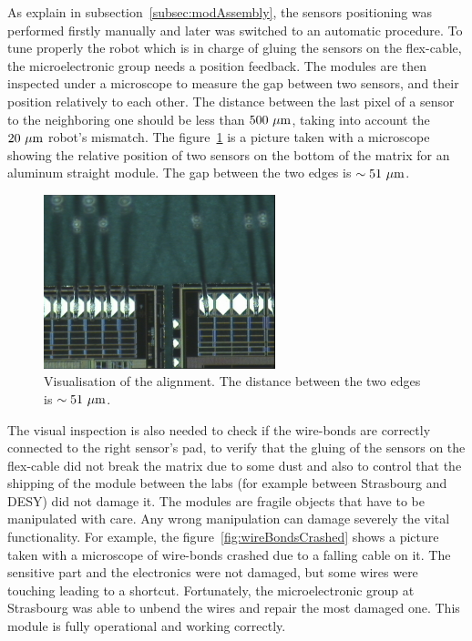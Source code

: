   As explain in subsection~\ref{subsec:modAssembly}, the sensors positioning was performed firstly manually and later was switched to an automatic procedure.
  To tune properly the robot which is in charge of gluing the sensors on the flex-cable, the microelectronic group needs a position feedback.
  The modules are then inspected under a microscope to measure the gap between two sensors, and their position relatively to each other.
  The distance between the last pixel of a sensor to the neighboring one should be less than $500~\mu\rm{m}$, taking into account the $20~\mu\rm{m}$ robot's mismatch.
  The figure~\ref{fig:visAlign} is a picture taken with a microscope showing the relative position of two sensors on the bottom of the matrix for an aluminum straight module.
  The gap between the two edges is $\sim 51~\mu\rm{m}$. 
  
  \begin{figure}
    \centering
    \includegraphics[width=0.6\textwidth]{Pictures/labTests/alignment_sensors.jpg}
    \caption{Visualisation of the alignment. The distance between the two edges is $\sim 51~\mu\rm{m}$.}
    \label{fig:visAlign}
  \end{figure}
  
  The visual inspection is also needed to check if the wire-bonds are correctly connected to the right sensor's pad, to verify that the gluing of the sensors on the flex-cable did not break the matrix due to some dust and also to control that the shipping of the module between the labs (for example between Strasbourg and DESY) did not damage it.
  The modules are fragile objects that have to be manipulated with care.
  Any wrong manipulation can damage severely the vital functionality.
  For example, the figure~\ref{fig:wireBondsCrashed} shows a picture taken with a microscope of wire-bonds crashed due to a falling cable on it.
  The sensitive part and the electronics were not damaged, but some wires were touching leading to a shortcut.
  Fortunately, the microelectronic group at Strasbourg was able to unbend the wires and repair the most damaged one.
  This module is fully operational and working correctly.

